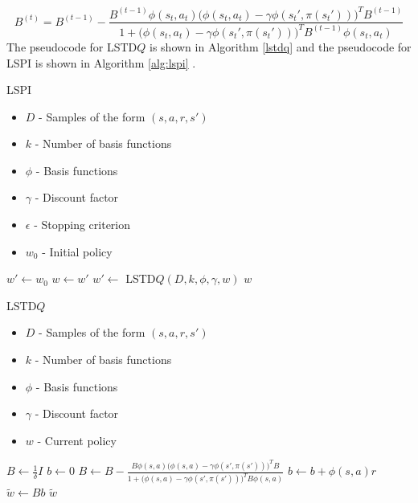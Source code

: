 \begin{equation}
\label{eq:lspi}
    B^{(t)} = B^{(t-1)} - \frac{B^{(t-1)}\phi(s_t,a_t)\big(\phi(s_t,a_t) - \gamma\phi(s_t',\pi(s_t'))\big)^TB^{(t-1)}}{1 + \big(\phi(s_t,a_t) - \gamma\phi(s_t',\pi(s_t'))\big)^TB^{(t-1)}\phi(s_t,a_t)}
\end{equation}
The pseudocode for LSTD$Q$ is shown in Algorithm \ref{lstdq} and the pseudocode for LSPI is shown in Algorithm \ref{alg:lspi} \cite{lspi}.

\begin{algorithm}
\caption{LSPI}
\label{alg:lspi}
    {\fontsize{12}{10}\selectfont
    \begin{algorithmic}[1]
        \REQUIRE
            \begin{itemize} 
                \item $D$ - Samples of the form $(s,a,r,s')$ 
                \item $k$ - Number of basis functions
                \item $\phi$ - Basis functions
                \item $\gamma$ - Discount factor
                \item $\epsilon$ - Stopping criterion
                \item $w_0$ - Initial policy
            \end{itemize}
        \STATE $w' \leftarrow w_0$
        \REPEAT
            \STATE $w \leftarrow w'$
            \STATE $w' \leftarrow$ LSTD$Q (D, k, \phi, \gamma, w)$
        \RETURN $w$
    \end{algorithmic}
    }
\end{algorithm}

\begin{algorithm}
\caption{LSTD$Q$}
\label{lstdq}
    {\fontsize{12}{10}\selectfont
    \begin{algorithmic}[1]
        \REQUIRE
            \begin{itemize} 
                \item $D$ - Samples of the form $(s,a,r,s')$ 
                \item $k$ - Number of basis functions
                \item $\phi$ - Basis functions
                \item $\gamma$ - Discount factor
                \item $w$ - Current policy
            \end{itemize}
        \STATE $B \leftarrow \frac{1}{\delta}I$ 
        \STATE $b \leftarrow 0$ 
            \STATE $B \leftarrow B - \frac{B\phi(s,a)\big(\phi(s,a) - \gamma\phi(s',\pi(s'))\big)^TB}{1 + \big(\phi(s,a) - \gamma\phi(s',\pi(s'))\big)^TB\phi(s,a)}$
            \STATE $b \leftarrow b + \phi(s,a)r$
        \ENDFOR
        \STATE $\tilde{w} \leftarrow Bb$
        \RETURN $\tilde{w}$
    \end{algorithmic}
    }
\end{algorithm}

